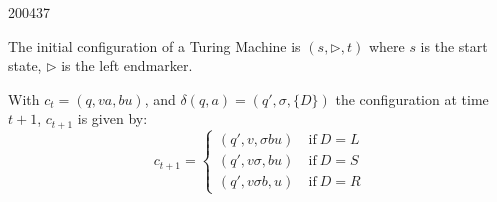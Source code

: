 \documentclass[10pt,\jkfside,a4paper]{article}
\begin{document}
\begin{examquestion}{2004}{3}{7}
\begin{enumerate}
The initial configuration of a Turing Machine is $(s, \triangleright, t)$
where $s$ is the start state, $\triangleright$ is the left endmarker.

With $c_t = (q, va, bu)$, and $\delta(q, a) = (q', \sigma, \{D\})$ the
configuration at time $t+1$, $c_{t+1}$ is given by:
\[
c_{t+1} =
\begin{cases}
(q', v, \sigma b u) & \ \text{if} \ D=L \\
(q', v\sigma, b u) & \ \text{if} \ D=S \\
(q', v\sigma b, u) & \ \text{if} \ D=R
\end{cases}
\]

\end{enumerate}

\end{examquestion}
\end{document}
